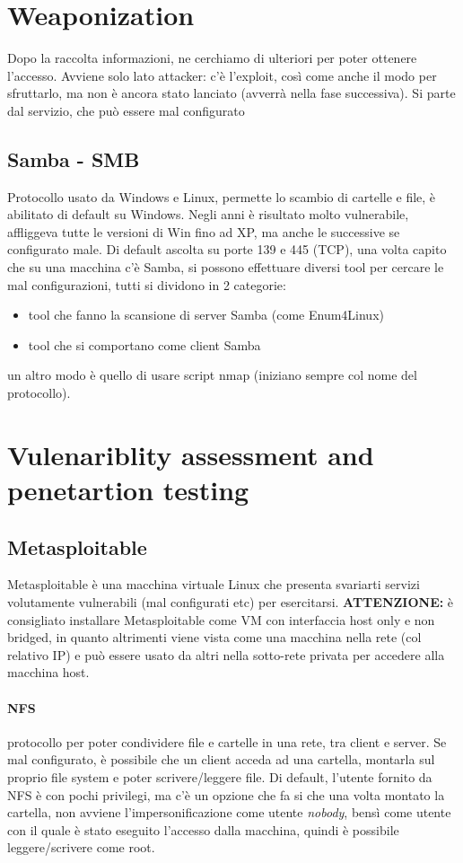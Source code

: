 \documentclass{article}
\begin{document}
\section{Weaponization}
Dopo la raccolta informazioni, ne cerchiamo di ulteriori per poter ottenere l'accesso. Avviene solo lato attacker: c'è l'exploit, così come anche il modo per sfruttarlo, ma non è ancora stato lanciato (avverrà nella fase successiva). Si parte dal servizio, che può essere mal configurato
\subsection{Samba - SMB}
Protocollo usato da Windows e Linux, permette lo scambio di cartelle e file, è abilitato di default su Windows. Negli anni è risultato molto vulnerabile, affliggeva tutte le versioni di Win fino ad XP, ma anche le successive se configurato male. Di default ascolta su porte 139 e 445 (TCP), una volta capito che su una macchina c'è Samba, si possono effettuare diversi tool per cercare le mal configurazioni, tutti si dividono in 2 categorie:
\begin{itemize}
\item tool che fanno la scansione di server Samba (come Enum4Linux)
\item tool che si comportano come client Samba
\end{itemize}
un altro modo è quello di usare script nmap (iniziano sempre col nome del protocollo).
\section{Vulenariblity assessment and penetartion testing}
\subsection{Metasploitable}
Metasploitable è una macchina virtuale Linux che presenta svariarti servizi volutamente vulnerabili (mal configurati etc) per esercitarsi. \textbf{ATTENZIONE:} è consigliato installare Metasploitable come VM con interfaccia host only e non bridged, in quanto altrimenti viene vista come una macchina nella rete (col relativo IP) e può essere usato da altri nella sotto-rete privata per accedere alla macchina host.
\paragraph{NFS}protocollo per poter condividere file e cartelle in una rete, tra client e server. Se mal configurato, è possibile che un client acceda ad una cartella, montarla sul proprio file system e poter scrivere/leggere file. Di default, l'utente fornito da NFS è con pochi privilegi, ma c'è un opzione che fa si che una volta montato la cartella, non avviene l'impersonificazione come utente \textit{nobody}, bensì come utente con il quale è stato eseguito l'accesso dalla macchina, quindi è possibile leggere/scrivere come root.
\end{document}
